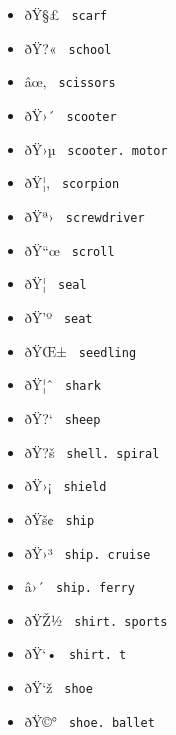 \begin{itemize}
\item
  \label{symbol-scarf}{{ ðŸ§£ } \texttt{\ scarf\ }}
\item
  \label{symbol-school}{{ ðŸ?« } \texttt{\ school\ }}
\item
  \label{symbol-scissors}{{ âœ‚ } \texttt{\ scissors\ }}
\item
  \label{symbol-scooter}{{ ðŸ›´ } \texttt{\ scooter\ }}
\item
  \label{symbol-scooter.motor}{{ ðŸ›µ }
  \texttt{\ scooter.\ motor\ }}
\item
  \label{symbol-scorpion}{{ ðŸ¦‚ } \texttt{\ scorpion\ }}
\item
  \label{symbol-screwdriver}{{ ðŸª› }
  \texttt{\ screwdriver\ }}
\item
  \label{symbol-scroll}{{ ðŸ``œ } \texttt{\ scroll\ }}
\item
  \label{symbol-seal}{{ ðŸ¦­ } \texttt{\ seal\ }}
\item
  \label{symbol-seat}{{ ðŸ'º } \texttt{\ seat\ }}
\item
  \label{symbol-seedling}{{ ðŸŒ± } \texttt{\ seedling\ }}
\item
  \label{symbol-shark}{{ ðŸ¦ˆ } \texttt{\ shark\ }}
\item
  \label{symbol-sheep}{{ ðŸ?{}` } \texttt{\ sheep\ }}
\item
  \label{symbol-shell.spiral}{{ ðŸ?š }
  \texttt{\ shell.\ spiral\ }}
\item
  \label{symbol-shield}{{ ðŸ›¡ } \texttt{\ shield\ }}
\item
  \label{symbol-ship}{{ ðŸš¢ } \texttt{\ ship\ }}
\item
  \label{symbol-ship.cruise}{{ ðŸ›³ }
  \texttt{\ ship.\ cruise\ }}
\item
  \label{symbol-ship.ferry}{{ â›´ }
  \texttt{\ ship.\ ferry\ }}
\item
  \label{symbol-shirt.sports}{{ ðŸŽ½ }
  \texttt{\ shirt.\ sports\ }}
\item
  \label{symbol-shirt.t}{{ ðŸ`• } \texttt{\ shirt.\ t\ }}
\item
  \label{symbol-shoe}{{ ðŸ`ž } \texttt{\ shoe\ }}
\item
  \label{symbol-shoe.ballet}{{ ðŸ©° }
  \texttt{\ shoe.\ ballet\ }}

\end{itemize}

